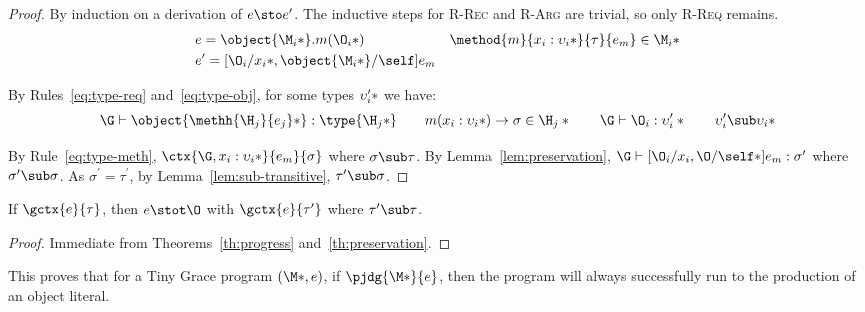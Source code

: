 \begin{theorem}[Preservation]
  \begin{proof}
    By induction on a derivation of $e \sto e^\prime$.  The inductive steps for
    \textsc{R-Rec} and \textsc{R-Arg} are trivial, so only \textsc{R-Req}
    remains.
%
    \begin{align*}
      &e = \object{\*\M_i*}.m(\*\O_i*) &
      \method{m}{\*x_i : \upsilon_i*}{\tau}{e_m} \in \*\M_i* \\
      &e^\prime = [\*\O_i/x_i*, \object{\*\M_i*}/\self]e_m &
    \end{align*}

    \noindent By Rules~\ref{eq:type-req} and~\ref{eq:type-obj}, for some types
    $\*\upsilon^\prime_i*$ we have:
%
    \begin{displaymath}
      \G \vdash \object{\*\methh{\H_j}{e_j}*} : \type{\*\H_j*} \quad\quad
      m(\*x_i : \upsilon_i*) \to \sigma \in \*\H_j* \quad\quad
      \G \vdash \*\O_i : \upsilon^\prime_i* \quad\quad
      \*\upsilon^\prime_i \sub \upsilon_i*
    \end{displaymath}

    \noindent By Rule~\ref{eq:type-meth}, $\ctx{\G,\*x_i :
    \upsilon_i*}{e_m}{\sigma}$ where $\sigma \sub \tau$. By
    Lemma~\ref{lem:preservation}, $\G \vdash [\*\O_i/x_i,\O/\self*]e_m :
    \sigma^\prime$ where $\sigma^\prime \sub \sigma$.  As $\sigma^\prime =
    \tau^\prime$, by Lemma~\ref{lem:sub-transitive}, $\tau^\prime \sub \sigma$.
  \end{proof}

\end{theorem}

\begin{theorem}\label{th:type-soundness}
  If $\gctx{e}{\tau}$, then $e \stot \O$ with $\gctx{e}{\tau^\prime}$ where
  $\tau^\prime \sub \tau$.

  \begin{proof}
    Immediate from Theorems~\ref{th:progress} and~\ref{th:preservation}.
  \end{proof}
\end{theorem}

\noindent This proves that for a Tiny Grace program $(\*\M*, e)$, if
$\pjdg{\*\M*}{e}$, then the program will always successfully run to the
production of an object literal.

